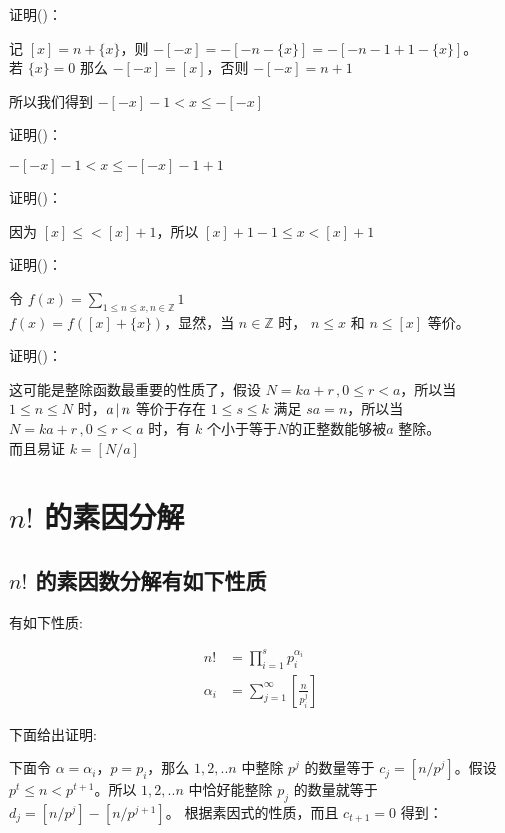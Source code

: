 证明(\nextproof)：

记 $[x] = n + \{x\}$，则 $-[-x] = - [- n - \{x\}] = - [-n - 1 + 1 - \{x\}]$。\\
若 $\{x\} = 0$ 那么 $-[-x] = [x]$，否则 $-[-x] = n + 1$

所以我们得到 $ -[-x] - 1 < x \le -[-x]$

\newline

证明(\nextproof)：

$ -[-x] - 1 < x \le -[-x] - 1 + 1$

\newline

证明(\nextproof)：

因为 $[x] \le < [x] + 1$，所以 $[x] + 1 - 1 \le x < [x] + 1$

\newline

证明(\nextproof)：

令 $f(x) = \sum_{1 \le n \le x, n \in \mathbb{Z}}1$ \\
$f(x) = f([x] + \{x\})$，显然，当 $n \in \mathbb{Z}$ 时， $n \le x $ 和  $n \le [x]$ 等价。

\newline

证明(\nextproof)：

这可能是整除函数最重要的性质了，假设 $N = ka +r \,, 0 \le r < a$，所以当 $1 \le n \le N$ 时，$a \,\vert\, n$ 等价于存在 $1 \le s \le k$ 满足 $sa = n$，所以当$N = ka +r \,, 0 \le r < a$ 时，有 $k$ 个小于等于$N$的正整数能够被$a $ 整除。\\
而且易证 $k = [N/a]$

\section{$n!$ 的素因分解}

\subsection{$n!$ 的素因数分解有如下性质}

有如下性质: 

\begin{align*}
n! &= \prod_{i=1}^{s}p_i^{\alpha_i} \\
\alpha_i & = \sum_{j=1}^{\infty}[\frac{n}{p_i^j}]
\end{align*}

下面给出证明:

下面令 $\alpha = \alpha_i$，$p = p_i$，那么 $1,2,..n$ 中整除 $p^j$ 的数量等于 $c_j = [n/p^j]$。假设 $p^t \le n < p^{t+1}$。所以 $1,2,..n$ 中恰好能整除 $p_j$ 的数量就等于 $d_j = [n/p^j] - [n/p^{j+1}]$。
根据素因式的性质，而且 $c_{t+1} = 0$ 得到：

